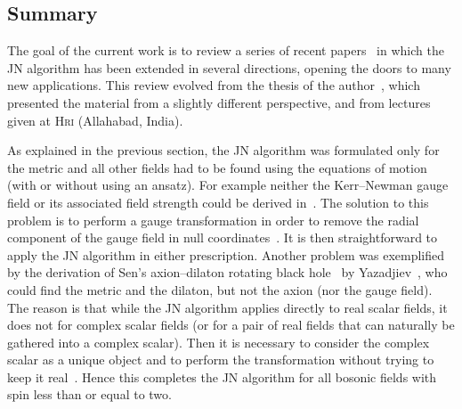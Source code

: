 \subsection{Summary}



The goal of the current work is to review a series of recent papers~\cite{Erbin:2015:JanisNewmanAlgorithmSimplifications, Erbin:2015:FivedimensionalJanisNewmanAlgorithm, Erbin:2016:DecipheringGeneralizingDemianskiJanisNewman, Erbin:2015:SupergravityComplexParameters} in which the JN algorithm has been extended in several directions, opening the doors to many new applications.
This review evolved from the thesis of the author~\cite{Erbin:2015:BlackHolesN}, which presented the material from a slightly different perspective, and from lectures given at \textsc{Hri} (Allahabad, India).

As explained in the previous section, the JN algorithm was formulated only for the metric and all other fields had to be found using the equations of motion (with or without using an ansatz).
For example neither the Kerr--Newman gauge field or its associated field strength could be derived in~\cite{Newman:1965:MetricRotatingCharged}.
The solution to this problem is to perform a gauge transformation in order to remove the radial component of the gauge field in null coordinates~\cite{Erbin:2015:JanisNewmanAlgorithmSimplifications}.
It is then straightforward to apply the JN algorithm in either prescription.\footnotemark{}%
Another problem was exemplified by the derivation of Sen's axion--dilaton rotating black hole~\cite{Sen:1992:RotatingChargedBlack} by Yazadjiev~\cite{Yazadjiev:2000:NewmanJanisMethodRotating}, who could find the metric and the dilaton, but not the axion (nor the gauge field).
The reason is that while the JN algorithm applies directly to real scalar fields, it does not for complex scalar fields (or for a pair of real fields that can naturally be gathered into a complex scalar).
Then it is necessary to consider the complex scalar as a unique object and to perform the transformation without trying to keep it real~\cite{Erbin:2015:SupergravityComplexParameters}.
Hence this completes the JN algorithm for all bosonic fields with spin less than or equal to two.

